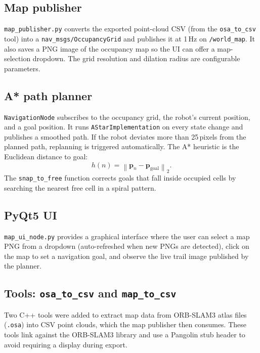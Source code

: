 \documentclass[11pt,a4paper]{article}
\begin{document}
\subsection{Map publisher}

\texttt{map\_publisher.py} converts the exported point-cloud CSV (from the
\texttt{osa\_to\_csv} tool) into a \texttt{nav\_msgs/OccupancyGrid} and
publishes it at 1\,Hz on \texttt{/world\_map}. It also saves a PNG image of
the occupancy map so the UI can offer a map-selection dropdown. The grid
resolution and dilation radius are configurable parameters.

\subsection{A* path planner}

\texttt{NavigationNode} subscribes to the occupancy grid, the robot's current
position, and a goal position. It runs \texttt{AStarImplementation} on every
state change and publishes a smoothed path. If the robot deviates more than
25\,pixels from the planned path, replanning is triggered automatically. The
A* heuristic is the Euclidean distance to goal:
\[
  h(n) = \left\|\mathbf{p}_n - \mathbf{p}_{\text{goal}}\right\|_2.
\]
The \texttt{snap\_to\_free} function corrects goals that fall inside occupied
cells by searching the nearest free cell in a spiral pattern.

\subsection{PyQt5 UI}

\texttt{map\_ui\_node.py} provides a graphical interface where the user can
select a map PNG from a dropdown (auto-refreshed when new PNGs are detected),
click on the map to set a navigation goal, and observe the live trail image
published by the planner.

\subsection{Tools: \texttt{osa\_to\_csv} and \texttt{map\_to\_csv}}

Two C++ tools were added to extract map data from ORB-SLAM3 atlas files
(\texttt{.osa}) into CSV point clouds, which the map publisher then consumes.
These tools link against the ORB-SLAM3 library and use a Pangolin stub header
to avoid requiring a display during export.

\end{document}
